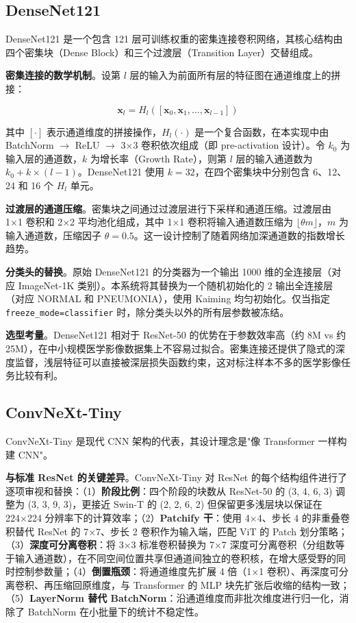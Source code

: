 \documentclass[12pt,a4paper,UTF8,openany]{ctexbook}
\begin{document}
\subsection{DenseNet121}

DenseNet121 是一个包含 121 层可训练权重的密集连接卷积网络，其核心结构由四个密集块（Dense Block）和三个过渡层（Transition Layer）交替组成\cite{huang2017}。

\textbf{密集连接的数学机制}。设第 $l$ 层的输入为前面所有层的特征图在通道维度上的拼接：

\begin{equation}
\mathbf{x}_l = H_l\left([\mathbf{x}_0, \mathbf{x}_1, \ldots, \mathbf{x}_{l-1}]\right)
\end{equation}

其中 $[\cdot]$ 表示通道维度的拼接操作，$H_l(\cdot)$ 是一个复合函数，在本实现中由 BatchNorm $\to$ ReLU $\to$ 3×3 卷积依次组成（即 pre-activation 设计）。令 $k_0$ 为输入层的通道数，$k$ 为增长率（Growth Rate），则第 $l$ 层的输入通道数为 $k_0 + k \times (l-1)$。DenseNet121 使用 $k=32$，在四个密集块中分别包含 6、12、24 和 16 个 $H_l$ 单元。

\textbf{过渡层的通道压缩}。密集块之间通过过渡层进行下采样和通道压缩。过渡层由 1×1 卷积和 2×2 平均池化组成，其中 1×1 卷积将输入通道数压缩为 $\lfloor\theta m\rfloor$，$m$ 为输入通道数，压缩因子 $\theta=0.5$。这一设计控制了随着网络加深通道数的指数增长趋势。

\textbf{分类头的替换}。原始 DenseNet121 的分类器为一个输出 1000 维的全连接层（对应 ImageNet-1K 类别）。本系统将其替换为一个随机初始化的 2 输出全连接层（对应 NORMAL 和 PNEUMONIA），使用 Kaiming 均匀初始化。仅当指定 \texttt{freeze\_mode=classifier} 时，除分类头以外的所有层参数被冻结。

\textbf{选型考量}。DenseNet121 相对于 ResNet-50 的优势在于参数效率高（约 8M vs 约 25M），在中小规模医学影像数据集上不容易过拟合。密集连接还提供了隐式的深度监督，浅层特征可以直接被深层损失函数约束，这对标注样本不多的医学影像任务比较有利。

\subsection{ConvNeXt-Tiny}

ConvNeXt-Tiny 是现代 CNN 架构的代表，其设计理念是"像 Transformer 一样构建 CNN"\cite{liu2022}。

\textbf{与标准 ResNet 的关键差异}。ConvNeXt-Tiny 对 ResNet 的每个结构组件进行了逐项审视和替换：（1）\textbf{阶段比例}：四个阶段的块数从 ResNet-50 的 (3, 4, 6, 3) 调整为 (3, 3, 9, 3)，更接近 Swin-T 的 (2, 2, 6, 2) 但保留更多浅层块以保证在 224×224 分辨率下的计算效率；（2）\textbf{Patchify 干}：使用 4×4、步长 4 的非重叠卷积替代 ResNet 的 7×7、步长 2 卷积作为输入端，匹配 ViT 的 Patch 划分策略；（3）\textbf{深度可分离卷积}：将 3×3 标准卷积替换为 7×7 深度可分离卷积（分组数等于输入通道数），在不同空间位置共享但通道间独立的卷积核，在增大感受野的同时控制参数量；（4）\textbf{倒置瓶颈}：将通道维度先扩展 4 倍（1×1 卷积）、再深度可分离卷积、再压缩回原维度，与 Transformer 的 MLP 块先扩张后收缩的结构一致；（5）\textbf{LayerNorm 替代 BatchNorm}：沿通道维度而非批次维度进行归一化，消除了 BatchNorm 在小批量下的统计不稳定性。
\end{document}
